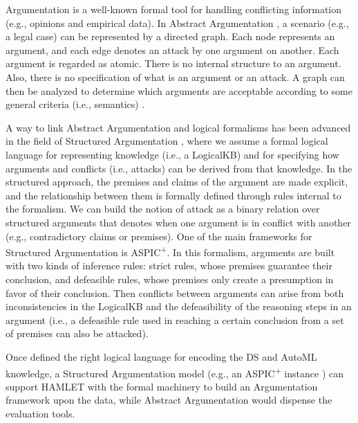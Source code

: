 \documentclass[5p,times]{elsarticle}
\begin{document}
Argumentation is a well-known formal tool for handling conflicting information (e.g., opinions and empirical data).
In Abstract Argumentation \cite{Dung1995abstractArg}, a scenario (e.g., a legal case) can be represented by a directed graph.
Each node represents an argument, and each edge denotes an attack by one argument on another. Each argument is regarded as atomic. There is no internal structure to an argument. Also, there is no specification of what is an argument or an attack. A graph can then be analyzed to determine which arguments are acceptable according to some general criteria (i.e., semantics) \cite{baroniCG11semantics}.

A way to link Abstract Argumentation and logical formalisms has been advanced in the field of Structured Argumentation \cite{BesnardGHMPST14structured}, where we assume a formal logical language for representing knowledge (i.e., a LogicalKB) and for specifying how arguments and conflicts (i.e., attacks) can be derived from that knowledge. 
In the structured approach, the premises and claims of the argument are made explicit, and the relationship between them is formally defined through rules internal to the formalism.
We can build the notion of attack as a binary relation over structured arguments that denotes when one argument is in conflict with another (e.g., contradictory claims or premises).
One of the main frameworks for Structured Argumentation is ASPIC\textsuperscript{+}\cite{Modgil2014aspic+}. 
In this formalism, arguments are built with two kinds of inference rules: strict rules, whose premises guarantee their conclusion, and defeasible rules, whose premises only create a presumption in favor of their conclusion. 
Then conflicts between arguments can arise from both inconsistencies in the LogicalKB and the defeasibility of the reasoning steps in an argument (i.e., a defeasible rule used in reaching a certain conclusion from a set of premises can also be attacked).

Once defined the right logical language for encoding the DS and AutoML knowledge, a Structured Argumentation model (e.g., an ASPIC\textsuperscript{+} instance \cite{arg2p-jlc}) can support HAMLET with the formal machinery to build an Argumentation framework upon the data, while Abstract Argumentation would dispense the evaluation tools.
\end{document}
